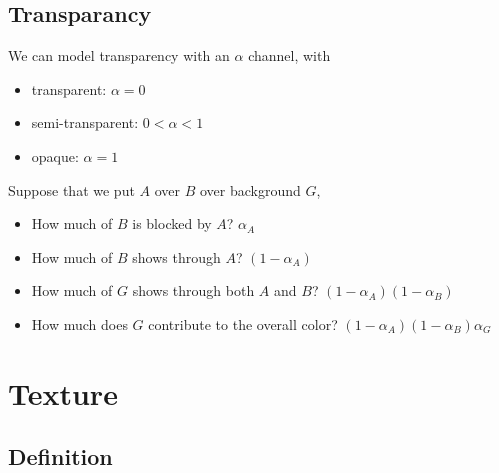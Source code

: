 \documentclass[twocolumn,landscape,10pt]{article}
\theoremstyle{definition}
\begin{document}
\subsection{Transparancy}

We can model transparency with an $\alpha$ channel, with
\begin{itemize}
    \item transparent: $\alpha=0$
    \item semi-transparent: $0<\alpha<1$
    \item opaque: $\alpha=1$
\end{itemize} 
Suppose that we put $A$ over $B$ over background $G$,
\begin{itemize}
    \item How much of $B$ is blocked by $A$? $\alpha_A$
    \item How much of $B$ shows through $A$? $(1-\alpha_A)$
    \item How much of $G$ shows through both $A$ and $B$? $(1-\alpha_A)(1-\alpha_B)$
    \item How much does $G$ contribute to the overall color?
        $(1-\alpha_A)(1-\alpha_B)\alpha_G$
\end{itemize} 


\section{Texture}

\subsection{Definition}
\end{document}
